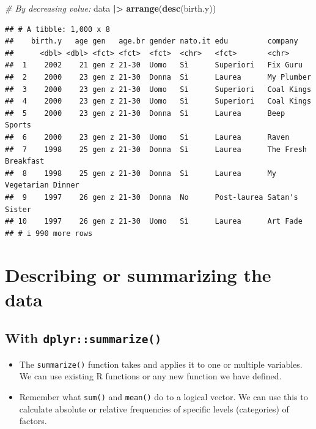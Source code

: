\documentclass[
]{book}
\newenvironment{Shaded}{\begin{snugshade}}{\end{snugshade}}
\newcommand{\CommentTok}[1]{\textcolor[rgb]{0.56,0.35,0.01}{\textit{#1}}}
\newcommand{\FunctionTok}[1]{\textcolor[rgb]{0.13,0.29,0.53}{\textbf{#1}}}
\newcommand{\NormalTok}[1]{#1}
\newcommand{\SpecialCharTok}[1]{\textcolor[rgb]{0.81,0.36,0.00}{\textbf{#1}}}
\providecommand{\tightlist}{%
  \setlength{\itemsep}{0pt}\setlength{\parskip}{0pt}}
\begin{document}
\begin{Shaded}
\begin{Highlighting}[]
\CommentTok{\# By decreasing value:}
\NormalTok{data }\SpecialCharTok{|\textgreater{}} 
  \FunctionTok{arrange}\NormalTok{(}\FunctionTok{desc}\NormalTok{(birth.y))}
\end{Highlighting}
\end{Shaded}

\begin{verbatim}
## # A tibble: 1,000 x 8
##    birth.y   age gen   age.br gender nato.it edu         company             
##      <dbl> <dbl> <fct> <fct>  <fct>  <chr>   <fct>       <chr>               
##  1    2002    21 gen z 21-30  Uomo   Sì      Superiori   Fix Guru            
##  2    2000    23 gen z 21-30  Donna  Sì      Laurea      My Plumber          
##  3    2000    23 gen z 21-30  Uomo   Sì      Superiori   Coal Kings          
##  4    2000    23 gen z 21-30  Uomo   Sì      Superiori   Coal Kings          
##  5    2000    23 gen z 21-30  Donna  Sì      Laurea      Beep Sports         
##  6    2000    23 gen z 21-30  Uomo   Sì      Laurea      Raven               
##  7    1998    25 gen z 21-30  Donna  Sì      Laurea      The Fresh Breakfast 
##  8    1998    25 gen z 21-30  Donna  Sì      Laurea      My Vegetarian Dinner
##  9    1997    26 gen z 21-30  Donna  No      Post-laurea Satan's Sister      
## 10    1997    26 gen z 21-30  Uomo   Sì      Laurea      Art Fade            
## # i 990 more rows
\end{verbatim}

\hypertarget{describing-or-summarizing-the-data}{%
\section{Describing or summarizing the data}\label{describing-or-summarizing-the-data}}

\hypertarget{with-dplyrsummarize}{%
\subsection{\texorpdfstring{With \texttt{dplyr::summarize()}}{With dplyr::summarize()}}\label{with-dplyrsummarize}}

\begin{itemize}
\tightlist
\item
  The \texttt{summarize()} function takes and applies it to one or multiple variables. We can use existing R functions or any new function we have defined.
\item
  Remember what \texttt{sum()} and \texttt{mean()} do to a logical vector. We can use this to calculate absolute or relative frequencies of specific levels (categories) of factors.
\end{itemize}
\end{document}
